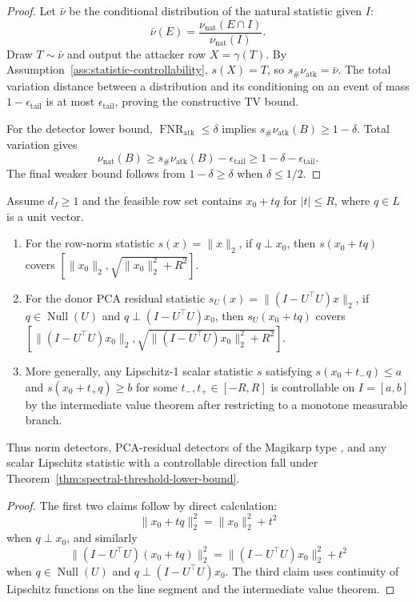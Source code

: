 \begin{proof}
Let $\bar\nu$ be the conditional distribution of the natural statistic given $I$:
\[
\bar\nu(E)=\frac{\nu_{\mathrm{nat}}(E\cap I)}{\nu_{\mathrm{nat}}(I)}.
\]
Draw $T\sim\bar\nu$ and output the attacker row $X=\gamma(T)$. By Assumption~\ref{ass:statistic-controllability}, $s(X)=T$, so $s_\#\nu_{\mathrm{atk}}=\bar\nu$. The total variation distance between a distribution and its conditioning on an event of mass $1-\epsilon_{\mathrm{tail}}$ is at most $\epsilon_{\mathrm{tail}}$, proving the constructive TV bound.

For the detector lower bound, $\operatorname{FNR}_{\mathrm{atk}}\le\delta$ implies $s_\#\nu_{\mathrm{atk}}(B)\ge 1-\delta$. Total variation gives
\[
\nu_{\mathrm{nat}}(B)
\ge
s_\#\nu_{\mathrm{atk}}(B)-\epsilon_{\mathrm{tail}}
\ge
1-\delta-\epsilon_{\mathrm{tail}}.
\]
The final weaker bound follows from $1-\delta\ge\delta$ when $\delta\le 1/2$.
\end{proof}

\begin{corollary}
\label{cor:common-statistic-controllability}
Assume $d_f\ge 1$ and the feasible row set contains $x_0+tq$ for $|t|\le R$, where $q\in L$ is a unit vector.
\begin{enumerate}[leftmargin=*]
\item For the row-norm statistic $s(x)=\|x\|_2$, if $q\perp x_0$, then $s(x_0+tq)$ covers $[\|x_0\|_2,\sqrt{\|x_0\|_2^2+R^2}]$.
\item For the donor PCA residual statistic $s_U(x)=\|(I-U^\top U)x\|_2$, if $q\in\operatorname{Null}(U)$ and $q\perp (I-U^\top U)x_0$, then $s_U(x_0+tq)$ covers $[\|(I-U^\top U)x_0\|_2,\sqrt{\|(I-U^\top U)x_0\|_2^2+R^2}]$.
\item More generally, any Lipschitz-1 scalar statistic $s$ satisfying $s(x_0+t_-q)\le a$ and $s(x_0+t_+q)\ge b$ for some $t_-,t_+\in[-R,R]$ is controllable on $I=[a,b]$ by the intermediate value theorem after restricting to a monotone measurable branch.
\end{enumerate}
Thus norm detectors, PCA-residual detectors of the Magikarp type \citep{land2024fishingmagikarpautomaticallydetecting}, and any scalar Lipschitz statistic with a controllable direction fall under Theorem~\ref{thm:spectral-threshold-lower-bound}.
\end{corollary}

\begin{proof}
The first two claims follow by direct calculation:
\[
\|x_0+tq\|_2^2=\|x_0\|_2^2+t^2
\]
when $q\perp x_0$, and similarly
\[
\|(I-U^\top U)(x_0+tq)\|_2^2
=
\|(I-U^\top U)x_0\|_2^2+t^2
\]
when $q\in\operatorname{Null}(U)$ and $q\perp (I-U^\top U)x_0$. The third claim uses continuity of Lipschitz functions on the line segment and the intermediate value theorem.
\end{proof}

